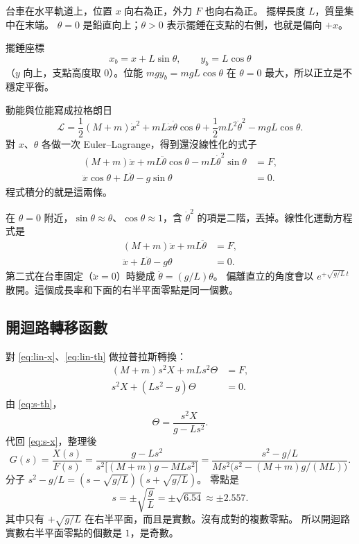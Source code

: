 \documentclass[12pt,a4paper]{article}
\begin{document}
台車在水平軌道上，位置 \(x\) 向右為正，外力 \(F\) 也向右為正。
擺桿長度 \(L\)，質量集中在末端。
\(\theta=0\) 是鉛直向上；\(\theta>0\) 表示擺錘在支點的右側，也就是偏向 \(+x\)。

擺錘座標
\[
  x_b=x+L\sin\theta,\qquad y_b=L\cos\theta
\]
（\(y\) 向上，支點高度取 0）。位能 \(mgy_b=mgL\cos\theta\) 在 \(\theta=0\) 最大，所以正立是不穩定平衡。

動能與位能寫成拉格朗日
\[
  \mathcal{L}
  =\frac12(M+m)\dot x^2
   +mL\dot x\dot\theta\cos\theta
   +\frac12 mL^2\dot\theta^2
   -mgL\cos\theta.
\]
對 \(x\)、\(\theta\) 各做一次 Euler--Lagrange，得到還沒線性化的式子
\begin{align}
  (M+m)\ddot x+mL\ddot\theta\cos\theta-mL\dot\theta^2\sin\theta&=F,
  \label{eq:nl-x}\\
  \ddot x\cos\theta+L\ddot\theta-g\sin\theta&=0.
  \label{eq:nl-th}
\end{align}
程式積分的就是這兩條。

在 \(\theta=0\) 附近，\(\sin\theta\approx\theta\)、\(\cos\theta\approx 1\)，含 \(\dot\theta^2\) 的項是二階，丟掉。線性化運動方程式是
\begin{align}
  (M+m)\ddot x+mL\ddot\theta&=F,
  \label{eq:lin-x}\\
  \ddot x+L\ddot\theta-g\theta&=0.
  \label{eq:lin-th}
\end{align}
第二式在台車固定（\(\ddot x=0\)）時變成 \(\ddot\theta=(g/L)\theta\)。
偏離直立的角度會以 \(e^{+\sqrt{g/L}\,t}\) 散開。這個成長率和下面的右半平面零點是同一個數。

\subsection{開迴路轉移函數}

對 \eqref{eq:lin-x}、\eqref{eq:lin-th} 做拉普拉斯轉換：
\begin{align}
  (M+m)s^2X+mLs^2\Theta&=F,
  \label{eq:s-x}\\
  s^2X+(Ls^2-g)\Theta&=0.
  \label{eq:s-th}
\end{align}
由 \eqref{eq:s-th}，
\[
  \Theta=\frac{s^2X}{g-Ls^2}.
\]
代回 \eqref{eq:s-x}，整理後
\begin{equation}
  G(s)=\frac{X(s)}{F(s)}
  =\frac{g-Ls^2}{s^2\bigl[(M+m)g-MLs^2\bigr]}
  =\frac{s^2-g/L}{Ms^2\bigl(s^2-(M+m)g/(ML)\bigr)}.
  \label{eq:G}
\end{equation}
分子 \(s^2-g/L=(s-\sqrt{g/L})(s+\sqrt{g/L})\)。
零點是
\begin{equation}
  s=\pm\sqrt{\frac{g}{L}}=\pm\sqrt{6.54}\approx\pm 2.557.
  \label{eq:zeros}
\end{equation}
其中只有 \(+\sqrt{g/L}\) 在右半平面，而且是實數。沒有成對的複數零點。
所以開迴路實數右半平面零點的個數是 \(1\)，是奇數。
\end{document}
